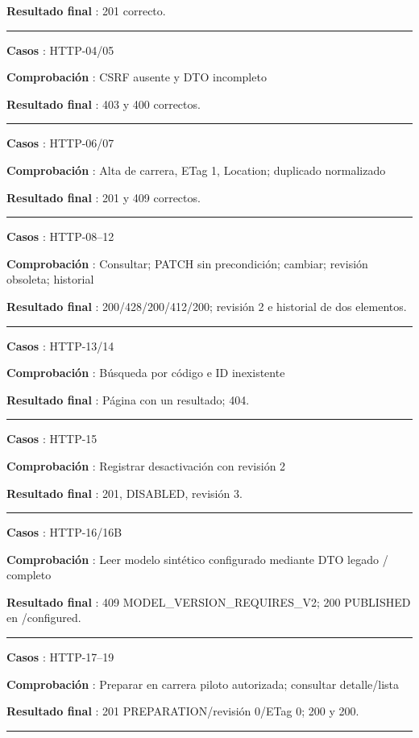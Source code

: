 \documentclass[11pt,a4paper]{article}
\begin{document}
\textbf{Resultado final }: 201 correcto.

\medskip\hrule\medskip

\textbf{Casos }: HTTP-04/05

\textbf{Comprobación }: CSRF ausente y DTO incompleto

\textbf{Resultado final }: 403 y 400 correctos.

\medskip\hrule\medskip

\textbf{Casos }: HTTP-06/07

\textbf{Comprobación }: Alta de carrera, ETag 1, Location; duplicado
normalizado

\textbf{Resultado final }: 201 y 409 correctos.

\medskip\hrule\medskip

\textbf{Casos }: HTTP-08--12

\textbf{Comprobación }: Consultar; PATCH sin precondición; cambiar;
revisión obsoleta; historial

\textbf{Resultado final }: 200/428/200/412/200; revisión 2 e historial
de dos elementos.

\medskip\hrule\medskip

\textbf{Casos }: HTTP-13/14

\textbf{Comprobación }: Búsqueda por código e ID inexistente

\textbf{Resultado final }: Página con un resultado; 404.

\medskip\hrule\medskip

\textbf{Casos }: HTTP-15

\textbf{Comprobación }: Registrar desactivación con revisión 2

\textbf{Resultado final }: 201, DISABLED, revisión 3.

\medskip\hrule\medskip

\textbf{Casos }: HTTP-16/16B

\textbf{Comprobación }: Leer modelo sintético configurado mediante DTO
legado / completo

\textbf{Resultado final }: 409 MODEL\_VERSION\_REQUIRES\_V2; 200
PUBLISHED en /configured.

\medskip\hrule\medskip

\textbf{Casos }: HTTP-17--19

\textbf{Comprobación }: Preparar en carrera piloto autorizada; consultar
detalle/lista

\textbf{Resultado final }: 201 PREPARATION/revisión 0/ETag 0; 200 y 200.

\medskip\hrule\medskip
\end{document}
